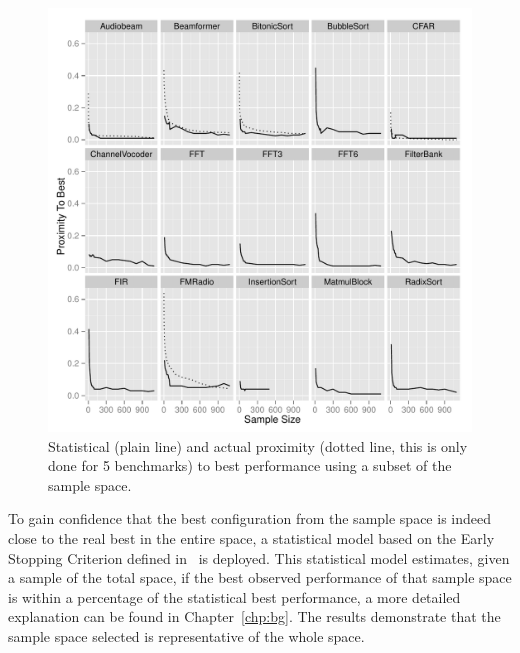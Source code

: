 \begin{figure}[t]
  \centering
    \includegraphics[width=1\textwidth]{streamit-paper/graphics/ESCProx.pdf}
    \caption{Statistical (plain line) and actual proximity (dotted line, this is only done for 5 benchmarks) to best performance using a subset of the sample space.}\label{fig:prox}
\end{figure}

To gain confidence that the best configuration from the sample space is indeed close to the real best in the entire space, a statistical model based on the Early Stopping Criterion defined in~\cite{vuduc2003AutomaticPerf} is deployed.
This statistical model estimates, given a sample of the total space, if the best observed performance of that sample space is within a percentage of the statistical best performance, a more detailed explanation can be found in Chapter~\ref{chp:bg}.
The results demonstrate that the sample space selected is representative of the whole space.

